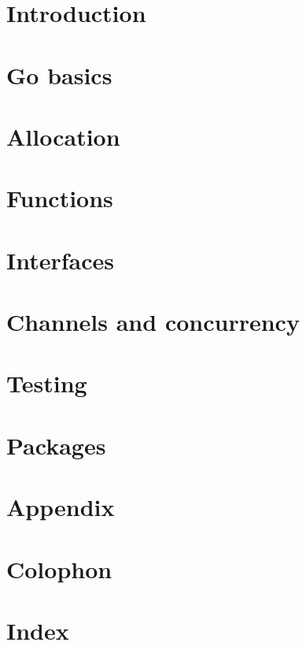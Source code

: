 \documentclass[a4paper,twoside]{blocksbook}
\begin{document}

\newpage
{}
\tableofcontents
\listoffigures
\listoftables

\chapter{Introduction}
\label{chap:intro}


\chapter{Go basics}
\label{chap:basics}


\chapter{Allocation}
\label{chap:allocation}


\chapter{Functions}
\label{chap:functions}


\chapter{Interfaces}
\label{chap:interfaces}


\chapter{Channels and concurrency}
\label{chap:channels}


\chapter{Testing}
\label{chap:testing}

\chapter{Packages}
\label{chap:packages}


\appendix
\chapter{Appendix}


\chapter{Colophon}


\chapter{Index}
\printindex


\end{document}
